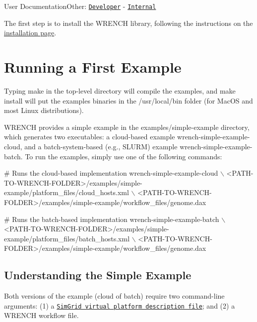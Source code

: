 User DocumentationOther\+: \href{../developer/getting-started.html}{\tt Developer} -\/ \href{../internal/getting-started.html}{\tt Internal}

The first step is to install the W\+R\+E\+N\+CH library, following the instructions on the \hyperlink{install}{installation page}.\hypertarget{getting-started_getting-started-example}{}\section{Running a First Example}\label{getting-started_getting-started-example}
Typing {\ttfamily make} in the top-\/level directory will compile the examples, and {\ttfamily make install} will put the examples binaries in the {\ttfamily /usr/local/bin} folder (for Mac\+OS and most Linux distributions).

W\+R\+E\+N\+CH provides a simple example in the {\ttfamily examples/simple-\/example} directory, which generates two executables\+: a cloud-\/based example {\ttfamily wrench-\/simple-\/example-\/cloud}, and a batch-\/system-\/based (e.\+g., S\+L\+U\+RM) example {\ttfamily wrench-\/simple-\/example-\/batch}. To run the examples, simply use one of the following commands\+:


\begin{DoxyCode}
# Runs the cloud-based implementation
wrench-simple-example-cloud \(\backslash\)
    <PATH-TO-WRENCH-FOLDER>/examples/simple-example/platform\_files/cloud\_hosts.xml \(\backslash\)
    <PATH-TO-WRENCH-FOLDER>/examples/simple-example/workflow\_files/genome.dax

# Runs the batch-based implementation
wrench-simple-example-batch \(\backslash\)
    <PATH-TO-WRENCH-FOLDER>/examples/simple-example/platform\_files/batch\_hosts.xml \(\backslash\)
    <PATH-TO-WRENCH-FOLDER>/examples/simple-example/workflow\_files/genome.dax
\end{DoxyCode}
\hypertarget{getting-started_getting-started-example-simple}{}\subsection{Understanding the Simple Example}\label{getting-started_getting-started-example-simple}
Both versions of the example (cloud of batch) require two command-\/line arguments\+: (1) a \href{http://simgrid.gforge.inria.fr/simgrid/3.19/doc/platform.html}{\tt Sim\+Grid virtual platform description file}; and (2) a W\+R\+E\+N\+CH workflow file.


